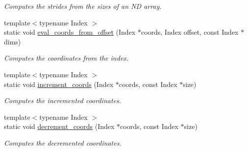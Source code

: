 \begin{DoxyCompactItemize}
\begin{DoxyCompactList}\small\item\em Computes the strides from the sizes of an N\-D array. \end{DoxyCompactList}\item 
\hypertarget{struct_d_o_1_1_offset_3_01_n_00_01_row_major_01_4_a0b52d46c505c64599af0ed217401d2fe}{{\footnotesize template$<$typename Index $>$ }\\static void \hyperlink{struct_d_o_1_1_offset_3_01_n_00_01_row_major_01_4_a0b52d46c505c64599af0ed217401d2fe}{eval\-\_\-coords\-\_\-from\-\_\-offset} (Index $\ast$coords, Index offset, const Index $\ast$dims)}\label{struct_d_o_1_1_offset_3_01_n_00_01_row_major_01_4_a0b52d46c505c64599af0ed217401d2fe}

\begin{DoxyCompactList}\small\item\em Computes the coordinates from the index. \end{DoxyCompactList}\item 
\hypertarget{struct_d_o_1_1_offset_3_01_n_00_01_row_major_01_4_acbe7b75b289ed1e202180fd94a2a707c}{{\footnotesize template$<$typename Index $>$ }\\static void \hyperlink{struct_d_o_1_1_offset_3_01_n_00_01_row_major_01_4_acbe7b75b289ed1e202180fd94a2a707c}{increment\-\_\-coords} (Index $\ast$coords, const Index $\ast$size)}\label{struct_d_o_1_1_offset_3_01_n_00_01_row_major_01_4_acbe7b75b289ed1e202180fd94a2a707c}

\begin{DoxyCompactList}\small\item\em Computes the incremented coordinates. \end{DoxyCompactList}\item 
\hypertarget{struct_d_o_1_1_offset_3_01_n_00_01_row_major_01_4_ac1c91b6ec96f5963221003a8cae3d912}{{\footnotesize template$<$typename Index $>$ }\\static void \hyperlink{struct_d_o_1_1_offset_3_01_n_00_01_row_major_01_4_ac1c91b6ec96f5963221003a8cae3d912}{decrement\-\_\-coords} (Index $\ast$coords, const Index $\ast$size)}\label{struct_d_o_1_1_offset_3_01_n_00_01_row_major_01_4_ac1c91b6ec96f5963221003a8cae3d912}

\begin{DoxyCompactList}\small\item\em Computes the decremented coordinates. \end{DoxyCompactList}\end{DoxyCompactItemize}


